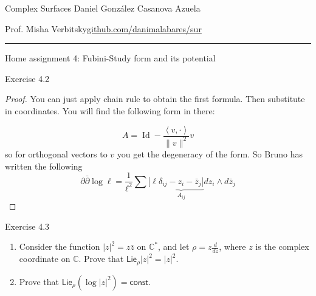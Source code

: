 
\setcounter{secnumdepth}{2}



\begin{minipage}{\textwidth}
	\begin{minipage}{1\textwidth}
		Complex Surfaces \hfill Daniel González Casanova Azuela
		
		{\small Prof. Misha Verbitsky\hfill\href{https://github.com/danimalabares/sur}{github.com/danimalabares/sur}}
	\end{minipage}
\end{minipage}\vspace{.2cm}\hrule

\vspace{10pt}
{\huge Home assignment 4: Fubini-Study form and its potential}

\begin{thing4}{Exercise 4.2}\label{exer:4.2}\leavevmode

\end{thing4}

\begin{proof}\leavevmode
	You can just apply chain rule to obtain the first formula. Then substitute in coordinates. You will find the following form in there:

	\[A=\operatorname{Id}-\frac{\left<v,\cdot \right>}{\|v\|^2}v\]
	so for orthogonal vectors to \(v\) you get the degeneracy of the form. So Bruno has written the following
	\[\partial \bar\partial \operatorname{log} \ell=\frac{1}{\ell^2}\sum [\ell\underbrace{ \delta_{ij}-z_i - \bar{z}_j ]}_{A_{ij}}dz_i \wedge d\bar{z}_j\]
	
	
\end{proof}

\begin{thing4}{Exercise 4.3}\label{exer:4.3}\leavevmode
\begin{enumerate}[label=(\alph*)]
\item Consider the function \(|z|^2=z\bar{z}\) on \(\mathbb{C}^*\), and let \(\rho=z \frac{d}{dz}\), where \(z\) is the complex coordinate on \(\mathbb{C}\). Prove that \(\mathsf{Lie}_\rho |z|^2=|z|^2\).
\item Prove that \(\mathsf{Lie}_\rho(\operatorname{log} |z|^2)=\mathsf{const}\).
\end{enumerate}
\end{thing4}


